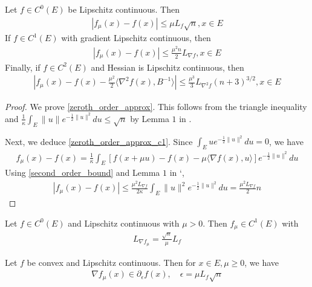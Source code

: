 \documentclass{article}
\begin{document}
\begin{theorem}
Let $f \in C^0(E)$ be Lipschitz continuous. Then 
\begin{align}
    |f_{\mu}(x) - f(x)| \leq \mu L_f \sqrt{n}, x \in E \label{zeroth_order_approx}
\end{align}
If $f \in C^1(E)$ with gradient Lipschitz continuous, then
\begin{align}
    |f_{\mu}(x) - f(x)| \leq \frac{\mu^2n}{2}L_{\nabla f}, x \in E \label{zeroth_order_approx_c1}
\end{align}
Finally, if $f \in C^2(E)$ and Hessian is Lipschitz continuous, then 
\begin{align}
    | f_{\mu}(x) - f(x) - \frac{\mu^2}{2}\langle \nabla^2 f(x), B^{-1}\rangle | \leq \frac{\mu^3}{3}L_{\nabla^2 f}(n+3)^{3/2}, x \in E
\end{align}

\begin{proof}
We prove \eqref{zeroth_order_approx}. This follows from the triangle inequality and $\frac{1}{\kappa}\int_E\|u\|e^{-\frac{1}{2}\|u\|^2}du \leq \sqrt{n}$ by Lemma $1$ in \cite{Nesterov2015}.  \newline  

Next, we deduce \eqref{zeroth_order_approx_c1}. Since $\int_E ue^{-\frac{1}{2}\|u\|^2}du = 0$, we have 
\begin{align}
f_{\mu}(x) - f(x) = \frac{1}{\kappa}\int_E[f(x+\mu u)-f(x) - \mu\langle \nabla f(x), u\rangle ]e^{-\frac{1}{2}\|u\|^2}du
\end{align}
Using \eqref{second_order_bound} and Lemma $1$ in `\cite{Nesterov2015},
\begin{align}
|f_{\mu}(x) - f(x)| \leq \frac{\mu^2 L_{\nabla f}}{2\kappa}\int_E\|u\|^2 e^{-\frac{1}{2}\|u\|^2}du = \frac{\mu^2L_{\nabla f}}{2}n
\end{align}
\end{proof}
\end{theorem}

\begin{lemma}
Let $f \in C^0(E)$ and Lipschitz continuous with $\mu > 0$. Then $f_{\mu} \in C^1(E)$ with 
\begin{align}
    L_{\nabla f_{\mu}} = \frac{\sqrt{n}}{\mu}L_f
\end{align}
\end{lemma}

\begin{theorem}
Let $f$ be convex and Lipschitz continuous. Then for $x \in E, \mu \geq 0$, we have 
\begin{align}
    \nabla f_{\mu}(x) \in \partial_{\epsilon}f(x), \quad \epsilon = \mu L_f\sqrt{n}
\end{align}
\end{theorem}
\end{document}
